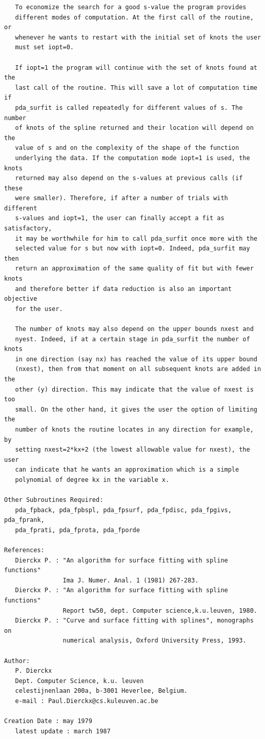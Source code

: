 \documentclass[11pt,twoside]{article}
\begin{document}
\begin{verbatim}
   To economize the search for a good s-value the program provides
   different modes of computation. At the first call of the routine, or
   whenever he wants to restart with the initial set of knots the user
   must set iopt=0.

   If iopt=1 the program will continue with the set of knots found at the
   last call of the routine. This will save a lot of computation time if
   pda_surfit is called repeatedly for different values of s. The number
   of knots of the spline returned and their location will depend on the
   value of s and on the complexity of the shape of the function
   underlying the data. If the computation mode iopt=1 is used, the knots
   returned may also depend on the s-values at previous calls (if these
   were smaller). Therefore, if after a number of trials with different
   s-values and iopt=1, the user can finally accept a fit as satisfactory,
   it may be worthwhile for him to call pda_surfit once more with the
   selected value for s but now with iopt=0. Indeed, pda_surfit may then
   return an approximation of the same quality of fit but with fewer knots
   and therefore better if data reduction is also an important objective
   for the user.

   The number of knots may also depend on the upper bounds nxest and
   nyest. Indeed, if at a certain stage in pda_surfit the number of knots
   in one direction (say nx) has reached the value of its upper bound
   (nxest), then from that moment on all subsequent knots are added in the
   other (y) direction. This may indicate that the value of nxest is too
   small. On the other hand, it gives the user the option of limiting the
   number of knots the routine locates in any direction for example, by
   setting nxest=2*kx+2 (the lowest allowable value for nxest), the user
   can indicate that he wants an approximation which is a simple
   polynomial of degree kx in the variable x.

Other Subroutines Required:
   pda_fpback, pda_fpbspl, pda_fpsurf, pda_fpdisc, pda_fpgivs, pda_fprank,
   pda_fprati, pda_fprota, pda_fporde

References:
   Dierckx P. : "An algorithm for surface fitting with spline functions"
                Ima J. Numer. Anal. 1 (1981) 267-283.
   Dierckx P. : "An algorithm for surface fitting with spline functions"
                Report tw50, dept. Computer science,k.u.leuven, 1980.
   Dierckx P. : "Curve and surface fitting with splines", monographs on
                numerical analysis, Oxford University Press, 1993.

Author:
   P. Dierckx
   Dept. Computer Science, k.u. leuven
   celestijnenlaan 200a, b-3001 Heverlee, Belgium.
   e-mail : Paul.Dierckx@cs.kuleuven.ac.be

Creation Date : may 1979
   latest update : march 1987
\end{verbatim}
\end{document}
